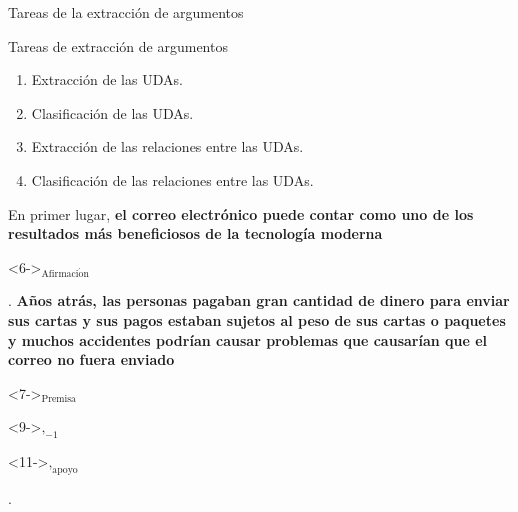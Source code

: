 \documentclass{beamer}
\begin{document}
\begin{frame}[t]{Tareas de la extracción de argumentos}
    \begin{block}{Tareas de extracción de argumentos}
        \begin{enumerate}
            \item<2-> Extracción de las UDAs.
            \item<5-> Clasificación de las UDAs.
            \item<8-> Extracción de las relaciones entre las UDAs.
            \item<10-> Clasificación de las relaciones entre las UDAs.
        \end{enumerate}
    \end{block}

    En primer lugar, \only<3->{[}\textbf<3->{el correo electrónico puede contar como uno de los resultados
    más beneficiosos de la tecnología moderna}\only<3->{]}\begin{onlyenv}<6->{$_{\mathrm{Afirmaci\acute{o}n}}$}\end{onlyenv}. 
    \only<4->{[}\textbf<4->{Años atrás, las personas pagaban gran cantidad de dinero para 
    enviar sus cartas y sus pagos estaban sujetos al peso de sus cartas o paquetes y muchos accidentes 
    podrían causar problemas que causarían que el correo no fuera enviado}\only<4->{]}\begin{onlyenv}<7->{$_{\mathrm{Premisa}}$}\end{onlyenv}\begin{onlyenv}<9->{$, _{-1}$}\end{onlyenv}\begin{onlyenv}<11->{$, _{\mathrm{apoyo}}$}\end{onlyenv}.


\end{frame}
\end{document}
